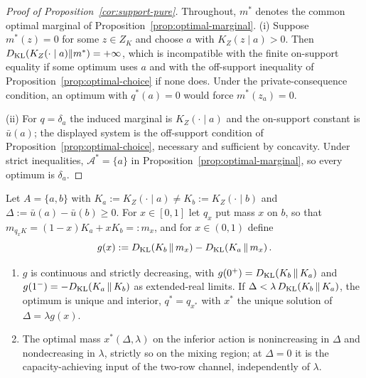 \begin{proof}[Proof of Proposition~\ref{cor:support-pure}]
Throughout, $m^*$ denotes the common optimal marginal of Proposition~\ref{prop:optimal-marginal}.
(i) Suppose $m^*(z)=0$ for some $z\in Z_K$ and choose $a$ with $K_Z(z\mid a)>0$.  Then
$D_{\mathrm{KL}}(K_Z(\cdot\mid a)\|m^*)=+\infty$, which is incompatible with the finite on-support equality if some optimum
uses $a$ and with the off-support inequality of Proposition~\ref{prop:optimal-choice} if none does.  Under the
private-consequence condition, an optimum with $q^*(a)=0$ would force $m^*(z_a)=0$.

(ii) For $q=\delta_a$ the induced marginal is $K_Z(\cdot\mid a)$ and the on-support constant is $\bar u(a)$; the
displayed system is the off-support condition of Proposition~\ref{prop:optimal-choice}, necessary and sufficient by
concavity.  Under strict inequalities, $\mathcal A^*=\{a\}$ in Proposition~\ref{prop:optimal-marginal}, so every
optimum is $\delta_a$.
\end{proof}

\begin{proposition}\label{prop:binary}
Let $A=\{a,b\}$ with $K_a:=K_Z(\cdot\mid a)\ne K_b:=K_Z(\cdot\mid b)$ and
$\Delta:=\bar u(a)-\bar u(b)\ge0$.  For $x\in[0,1]$ let $q_x$ put mass $x$ on $b$, so that
$m_{q_xK}=(1-x)K_a+xK_b=:m_x$, and for $x\in(0,1)$ define
\[
 g(x):=D_{\mathrm{KL}}\!\left(K_b\,\middle\|\,m_x\right)-D_{\mathrm{KL}}\!\left(K_a\,\middle\|\,m_x\right).
\]
\begin{enumerate}[label=\textup{(\roman*)},leftmargin=*]
\item $g$ is continuous and strictly decreasing, with $g(0^+)=D_{\mathrm{KL}}(K_b\,\|\,K_a)$ and
$g(1^-)=-D_{\mathrm{KL}}(K_a\,\|\,K_b)$ as extended-real limits.  If $\Delta<\lambda\,D_{\mathrm{KL}}(K_b\,\|\,K_a)$, the optimum is
unique and interior, $q^*=q_{x^*}$ with $x^*$ the unique solution of $\Delta=\lambda g(x)$.
\item The optimal mass $x^*(\Delta,\lambda)$ on the inferior action is nonincreasing in $\Delta$ and
nondecreasing in $\lambda$, strictly so on the mixing region; at $\Delta=0$ it is the capacity-achieving input
of the two-row channel, independently of $\lambda$.
\end{enumerate}
\end{proposition}

